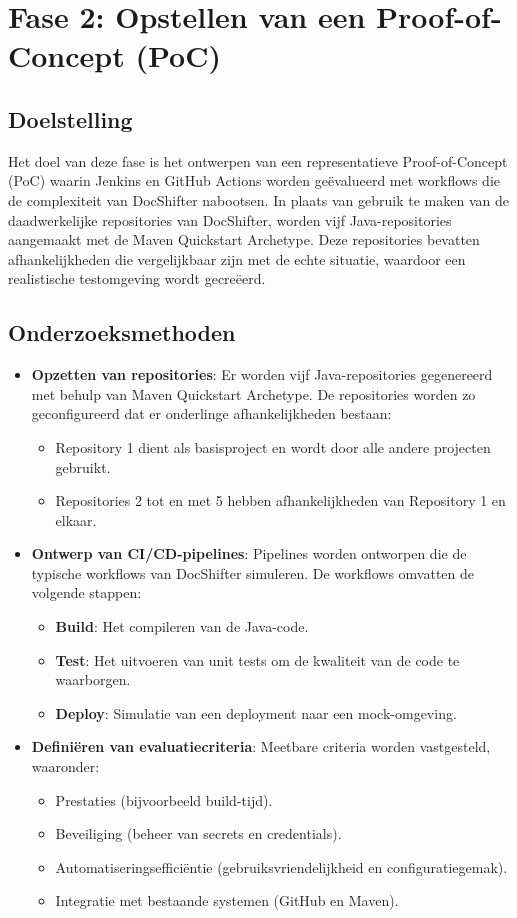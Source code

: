 \section{Fase 2: Opstellen van een Proof-of-Concept (PoC)}
\subsection*{Doelstelling}
Het doel van deze fase is het ontwerpen van een representatieve Proof-of-Concept (PoC) waarin Jenkins en GitHub Actions worden geëvalueerd met workflows die de complexiteit van DocShifter nabootsen. In plaats van gebruik te maken van de daadwerkelijke repositories van DocShifter, worden vijf Java-repositories aangemaakt met de Maven Quickstart Archetype. Deze repositories bevatten afhankelijkheden die vergelijkbaar zijn met de echte situatie, waardoor een realistische testomgeving wordt gecreëerd.

\subsection*{Onderzoeksmethoden}
\begin{itemize}
    \item \textbf{Opzetten van repositories}: Er worden vijf Java-repositories gegenereerd met behulp van Maven Quickstart Archetype. De repositories worden zo geconfigureerd dat er onderlinge afhankelijkheden bestaan: 
    \begin{itemize}
        \item Repository 1 dient als basisproject en wordt door alle andere projecten gebruikt.
        \item Repositories 2 tot en met 5 hebben afhankelijkheden van Repository 1 en elkaar.
    \end{itemize}
    \item \textbf{Ontwerp van CI/CD-pipelines}: Pipelines worden ontworpen die de typische workflows van DocShifter simuleren. De workflows omvatten de volgende stappen:
    \begin{itemize}
        \item \textbf{Build}: Het compileren van de Java-code.
        \item \textbf{Test}: Het uitvoeren van unit tests om de kwaliteit van de code te waarborgen.
        \item \textbf{Deploy}: Simulatie van een deployment naar een mock-omgeving.
    \end{itemize}
    \item \textbf{Definiëren van evaluatiecriteria}: Meetbare criteria worden vastgesteld, waaronder:
    \begin{itemize}
        \item Prestaties (bijvoorbeeld build-tijd).
        \item Beveiliging (beheer van secrets en credentials).
        \item Automatiseringsefficiëntie (gebruiksvriendelijkheid en configuratiegemak).
        \item Integratie met bestaande systemen (GitHub en Maven). 
    \end{itemize}
\end{itemize}

